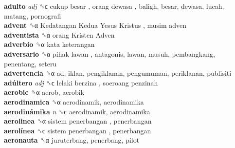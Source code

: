 \textbf{adulto} \emph{adj}  ␝ϲ   cukup besar ,  orang dewasa , baligh, besar, dewasa, lucah, matang, pornografi  \\
\textbf{advent} ␝α   Kedatangan Kedua Yesus Kristus ,  musim adven   \\
\textbf{adventista} ␝α   orang Kristen Adven   \\
\textbf{adverbio} ␝α   kata keterangan   \\
\textbf{adversario} ␝α   pihak lawan , antagonis, lawan, musuh, pembangkang, penentang, seteru  \\
\textbf{advertencia} ␝α  ad, iklan, pengiklanan, pengumuman, periklanan, publisiti  \\
\textbf{adúltero} \emph{adj}  ␝ϲ   lelaki berzina ,  soeroang penzinah   \\
\textbf{aerobic} ␝α  aerob, aerobik  \\
\textbf{aerodinamica} ␝α  aerodinamik, aerodinamika  \\
\textbf{aerodinámika} \emph{n}  ␝ϲ  aerodinamik, aerodinamika  \\
\textbf{aerolinea} ␝α   sistem penerbangan , penerbangan  \\
\textbf{aerolínea} ␝ϲ   sistem penerbangan , penerbangan  \\
\textbf{aeronauta} ␝α  juruterbang, penerbang, pilot  \\
